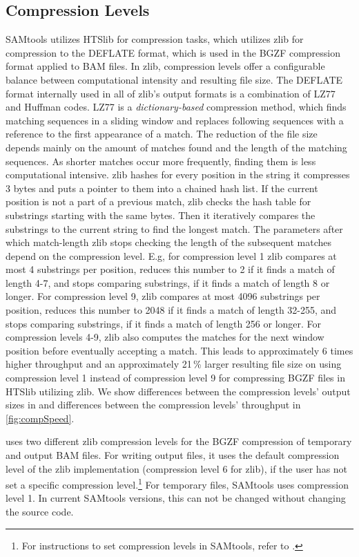 \subsection{Compression Levels}
SAMtools utilizes HTSlib for compression tasks, which utilizes zlib for compression to the DEFLATE format, which is used in the BGZF compression format applied to BAM files.
In zlib, compression levels offer a configurable balance between computational intensity and resulting file size. The DEFLATE format internally used in all of zlib's output formats is a combination of LZ77 and Huffman codes. LZ77 is a \textit{dictionary-based} compression method, which finds matching sequences in a sliding window and replaces following sequences with a reference to the first appearance of a match. The reduction of the file size depends mainly on the amount of matches found and the length of the matching sequences. As shorter matches occur more frequently, finding them is less computational intensive. zlib hashes for every position in the string it compresses 3 bytes and puts a pointer to them into a chained hash list. If the current position is not a part of a previous match, zlib checks the hash table for substrings starting with the same bytes. Then it iteratively compares the substrings to the current string to find the longest match. The parameters after which match-length zlib stops checking the length of the subsequent matches depend on the compression level. E.g, for compression level 1 zlib compares at most 4 substrings per position, reduces this number to 2 if it finds a match of length 4-7, and stops comparing substrings, if it finds a match of length 8 or longer. For compression level 9, zlib compares at most 4096 substrings per position, reduces this number to 2048 if it finds a match of length 32-255, and stops comparing substrings, if it finds a match of length 256 or longer. For compression levels 4-9, zlib also computes the matches for the next window position before eventually accepting a match. This leads to approximately 6 times higher throughput and an approximately 21\,\% larger resulting file size on using compression level 1 instead of compression level 9 for compressing BGZF files in HTSlib utilizing zlib. We show differences between the compression levels' output sizes in  and differences between the compression levels' throughput in \ref{fig:compSpeed}.

\sort uses two different zlib compression levels for the BGZF compression of temporary and output BAM files. For writing output files, it uses the default compression level of the zlib implementation (compression level 6 for zlib), if the user has not set a specific compression level.\footnote{For instructions to set compression levels in SAMtools, refer to .} For temporary files, SAMtools uses compression level 1. In current SAMtools versions, this can not be changed without changing the source code.


